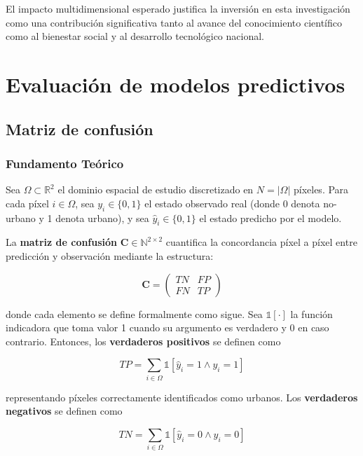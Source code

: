 El impacto multidimensional esperado justifica la inversión en esta investigación como una contribución significativa tanto al avance del conocimiento científico como al bienestar social y al desarrollo tecnológico nacional.

\section{Evaluación de modelos predictivos}

\subsection{Matriz de confusión}

\subsubsection{Fundamento Teórico}

Sea $\Omega \subset \mathbb{R}^2$ el dominio espacial de estudio discretizado en $N = |\Omega|$ píxeles. Para cada píxel $i \in \Omega$, sea $y_i \in \{0, 1\}$ el estado observado real (donde 0 denota no-urbano y 1 denota urbano), y sea $\hat{y}_i \in \{0, 1\}$ el estado predicho por el modelo.

La \textbf{matriz de confusión} $\mathbf{C} \in \mathbb{N}^{2 \times 2}$ cuantifica la concordancia píxel a píxel entre predicción y observación mediante la estructura:

\begin{equation}
\mathbf{C} = \begin{pmatrix}
TN & FP \\
FN & TP
\end{pmatrix}
\label{eq:confusion_matrix}
\end{equation}

donde cada elemento se define formalmente como sigue. Sea $\mathbb{1}[\cdot]$ la función indicadora que toma valor 1 cuando su argumento es verdadero y 0 en caso contrario. Entonces, los \textbf{verdaderos positivos} se definen como

\begin{equation}
TP = \sum_{i \in \Omega} \mathbb{1}[\hat{y}_i = 1 \land y_i = 1]
\label{eq:tp}
\end{equation}

representando píxeles correctamente identificados como urbanos. Los \textbf{verdaderos negativos} se definen como

\begin{equation}
TN = \sum_{i \in \Omega} \mathbb{1}[\hat{y}_i = 0 \land y_i = 0]
\label{eq:tn}
\end{equation}

